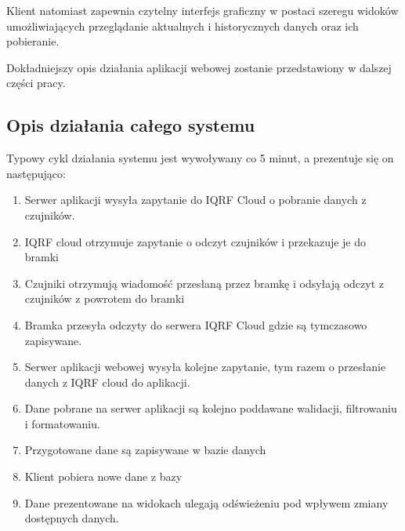 Klient natomiast zapewnia czytelny interfejs graficzny w postaci szeregu widoków umożliwiających przeglądanie aktualnych i 
historycznych danych oraz ich pobieranie.

Dokładniejszy opis działania aplikacji webowej zostanie przedstawiony w dalszej części pracy.

\subsection{Opis działania całego systemu}

Typowy cykl działania systemu jest wywoływany co 5 minut, a prezentuje się on następująco:

\begin{enumerate}
    \item Serwer aplikacji wysyła zapytanie do IQRF Cloud o pobranie danych z czujników.
    \item IQRF cloud otrzymuje zapytanie o odczyt czujników i przekazuje je do bramki
    \item Czujniki otrzymują wiadomość przesłaną przez bramkę i odsyłają odczyt z czujników z powrotem do bramki
    \item Bramka przesyła odczyty do serwera IQRF Cloud gdzie są tymczasowo zapisywane.
    \item Serwer aplikacji webowej wysyła kolejne zapytanie, tym razem o przesłanie danych z IQRF cloud
do aplikacji.
    \item Dane pobrane na serwer aplikacji są kolejno poddawane walidacji, filtrowaniu i formatowaniu.
    \item Przygotowane dane są zapisywane w bazie danych 
    \item Klient pobiera nowe dane z bazy
    \item Dane prezentowane na widokach ulegają odświeżeniu pod wpływem zmiany dostępnych danych.
\end{enumerate}